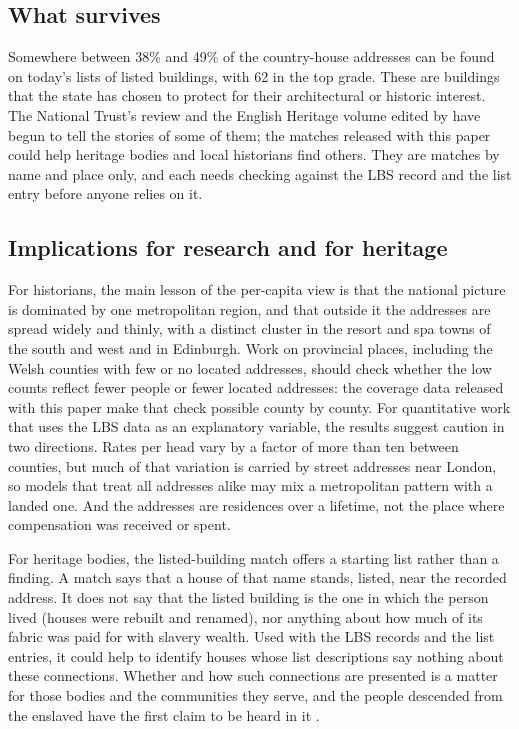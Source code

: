 \documentclass[11pt,a4paper]{article}
\begin{document}
\subsection{What survives}
Somewhere between 38\% and 49\% of the country-house addresses can be found on today's lists of listed buildings, with 62 in the top grade. These are buildings that the state has chosen to protect for their architectural or historic interest. The National Trust's review \citep{huxtable2020} and the English Heritage volume edited by \citet{dresser2013} have begun to tell the stories of some of them; the matches released with this paper could help heritage bodies and local historians find others. They are matches by name and place only, and each needs checking against the LBS record and the list entry before anyone relies on it.

\subsection{Implications for research and for heritage}
For historians, the main lesson of the per-capita view is that the national picture is dominated by one metropolitan region, and that outside it the addresses are spread widely and thinly, with a distinct cluster in the resort and spa towns of the south and west and in Edinburgh. Work on provincial places, including the Welsh counties with few or no located addresses, should check whether the low counts reflect fewer people or fewer located addresses: the coverage data released with this paper make that check possible county by county. For quantitative work that uses the LBS data as an explanatory variable, the results suggest caution in two directions. Rates per head vary by a factor of more than ten between counties, but much of that variation is carried by street addresses near London, so models that treat all addresses alike may mix a metropolitan pattern with a landed one. And the addresses are residences over a lifetime, not the place where compensation was received or spent.

For heritage bodies, the listed-building match offers a starting list rather than a finding. A match says that a house of that name stands, listed, near the recorded address. It does not say that the listed building is the one in which the person lived (houses were rebuilt and renamed), nor anything about how much of its fabric was paid for with slavery wealth. Used with the LBS records and the list entries, it could help to identify houses whose list descriptions say nothing about these connections. Whether and how such connections are presented is a matter for those bodies and the communities they serve, and the people descended from the enslaved have the first claim to be heard in it \citep{beckles2013}.
\end{document}
